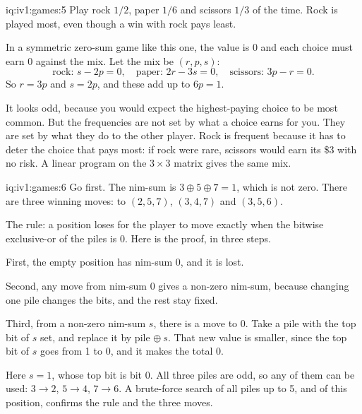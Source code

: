 \begin{solution}{iq:iv1:games:5}
Play rock $1/2$, paper $1/6$ and scissors $1/3$ of the time. Rock is played most, even though a win with rock pays least.

In a symmetric zero-sum game like this one, the value is 0 and each choice must earn 0 against the mix. Let the mix be $(r, p, s)$:
\[
\text{rock: } s - 2p = 0, \quad \text{paper: } 2r - 3s = 0, \quad \text{scissors: } 3p - r = 0.
\]
So $r = 3p$ and $s = 2p$, and these add up to $6p = 1$.

It looks odd, because you would expect the highest-paying choice to be most common. But the frequencies are not set by what a choice earns for you. They are set by what they do to the other player. Rock is frequent because it has to deter the choice that pays most: if rock were rare, scissors would earn its \$3 with no risk. A linear program on the $3 \times 3$ matrix gives the same mix.

\end{solution}

\begin{solution}{iq:iv1:games:6}
Go first. The nim-sum is $3 \oplus 5 \oplus 7 = 1$, which is not zero. There are three winning moves: to $(2, 5, 7)$, $(3, 4, 7)$ and $(3, 5, 6)$.

The rule: a position loses for the player to move exactly when the bitwise exclusive-or of the piles is 0. Here is the proof, in three steps.

First, the empty position has nim-sum 0, and it is lost.

Second, any move from nim-sum 0 gives a non-zero nim-sum, because changing one pile changes the bits, and the rest stay fixed.

Third, from a non-zero nim-sum $s$, there is a move to 0. Take a pile with the top bit of $s$ set, and replace it by pile $\oplus\ s$. That new value is smaller, since the top bit of $s$ goes from 1 to 0, and it makes the total 0.

Here $s = 1$, whose top bit is bit 0. All three piles are odd, so any of them can be used: $3 \to 2$, $5 \to 4$, $7 \to 6$. A brute-force search of all piles up to 5, and of this position, confirms the rule and the three moves.

\end{solution}


